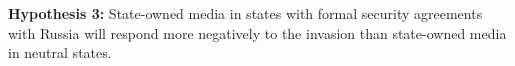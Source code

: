 \documentclass[12pt]{article}
\begin{document}
\textbf{Hypothesis 3:} State-owned media in states with formal security agreements with Russia will respond more negatively to the invasion than state-owned media in neutral states.



\newpage

\printbibliography

%
%
\end{document}
